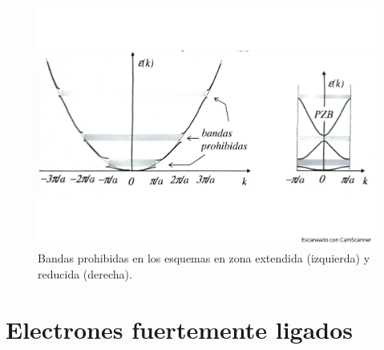 \begin{figure}[h!] \centering
    \includegraphics[scale=0.5]{Cuerpo/Ch_07/Fotos libro 4.pdf}
    \caption{Bandas prohibidas en los esquemas en zona extendida (izquierda) y reducida (derecha).}
    \label{Fig:07-04}
\end{figure}    

\section{Electrones fuertemente ligados}

